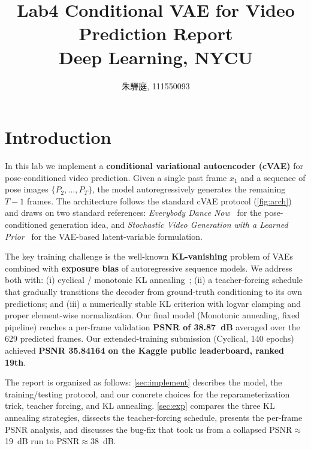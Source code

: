 \documentclass[10pt,twocolumn,letterpaper]{article}
\begin{document}
\title{\LARGE Lab4 Conditional VAE for Video Prediction Report \\[0.5em] \large Deep Learning, NYCU}
\author{朱驛庭, 111550093}
\maketitle

\section{Introduction}
\label{sec:intro}

In this lab we implement a \textbf{conditional variational autoencoder (cVAE)} for pose-conditioned video prediction. Given a single past frame $x_1$ and a sequence of pose images $\{P_2,\ldots,P_T\}$, the model autoregressively generates the remaining $T{-}1$ frames. The architecture follows the standard cVAE protocol (\cref{fig:arch}) and draws on two standard references: \emph{Everybody Dance Now}~\cite{chan2019everybody} for the pose-conditioned generation idea, and \emph{Stochastic Video Generation with a Learned Prior}~\cite{denton2018svg} for the VAE-based latent-variable formulation.

The key training challenge is the well-known \textbf{KL-vanishing} problem of VAEs combined with \textbf{exposure bias} of autoregressive sequence models. We address both with: (i) cyclical / monotonic KL annealing~\cite{fu2019cyclical}; (ii) a teacher-forcing schedule that gradually transitions the decoder from ground-truth conditioning to its own predictions; and (iii) a numerically stable KL criterion with logvar clamping and proper element-wise normalization. Our final model (Monotonic annealing, fixed pipeline) reaches a per-frame validation \textbf{PSNR of 38.87~dB} averaged over the 629 predicted frames. Our extended-training submission (Cyclical, 140 epochs) achieved \textbf{PSNR 35.84164 on the Kaggle public leaderboard, ranked 19th}.

The report is organized as follows: \cref{sec:implement} describes the model, the training/testing protocol, and our concrete choices for the reparameterization trick, teacher forcing, and KL annealing. \cref{sec:exp} compares the three KL annealing strategies, dissects the teacher-forcing schedule, presents the per-frame PSNR analysis, and discusses the bug-fix that took us from a collapsed PSNR$\approx$19~dB run to PSNR$\approx$38~dB.
\end{document}
